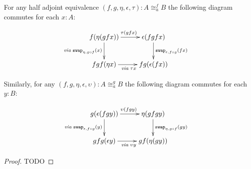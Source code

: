 \begin{lem}\label{lem:coh-fg}
For any half adjoint equivalence $(f,g,\eta,\epsilon,\tau) : A \cong_a^f B$ the following diagram commutes for each $x : A$:

\begin{align*}
\xymatrix{
f(\eta (g f x)) \ar[d]_{\mathit{via \; } \com{\eta}{g \circ f}{x}} \ar[r]^{\tau(gfx)} &
\epsilon (fgfx) \ar[d]^{\com{\epsilon}{f\circ g}{fx}} \\
fgf (\eta x) \ar[r]_{\mathit{via \;} \tau x} &
fg(\epsilon (f x))} 
\end{align*}

Similarly, for any $(f,g,\eta,\epsilon,\upsilon) : A \cong_a^g B$ the following diagram commutes for each $y : B$:

\begin{align*}
\xymatrix{
g(\epsilon (f g y)) \ar[d]_{\mathit{via \; } \com{\epsilon}{f \circ g}{y}} \ar[r]^{\upsilon(fgy)} &
\eta (gfgy) \ar[d]^{\com{\eta}{g\circ f}{gy}} \\
gfg (\epsilon y) \ar[r]_{\mathit{via \;} \upsilon y} &
gf(\eta (g y))} 
\end{align*}
\end{lem}
\begin{proof}
TODO
\end{proof}

